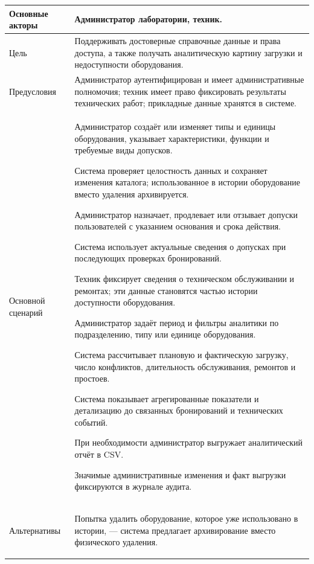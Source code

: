\documentclass[12pt,a4paper]{article}
\renewcommand{\arraystretch}{1.25}
\begin{document}
\begingroup
\small
{}
\renewcommand{\arraystretch}{1.1}
\begin{longtable}{|p{}|p{}|}
\hline
Основные акторы & Администратор лаборатории, техник. \\
\hline
Цель & Поддерживать достоверные справочные данные и права доступа, а также
получать аналитическую картину загрузки и недоступности оборудования. \\
\hline
Предусловия & Администратор аутентифицирован и имеет административные полномочия;
техник имеет право фиксировать результаты технических работ; прикладные данные
хранятся в системе. \\
\hline
Основной сценарий &
\begin{ucsteps}
    \item Администратор создаёт или изменяет типы и единицы оборудования, указывает характеристики, функции и требуемые виды допусков.
    \item Система проверяет целостность данных и сохраняет изменения каталога; использованное в истории оборудование вместо удаления архивируется.
    \item Администратор назначает, продлевает или отзывает допуски пользователей с указанием основания и срока действия.
    \item Система использует актуальные сведения о допусках при последующих проверках бронирований.
    \item Техник фиксирует сведения о техническом обслуживании и ремонтах; эти данные становятся частью истории доступности оборудования.
    \item Администратор задаёт период и фильтры аналитики по подразделению, типу или единице оборудования.
    \item Система рассчитывает плановую и фактическую загрузку, число конфликтов, длительность обслуживания, ремонтов и простоев.
    \item Система показывает агрегированные показатели и детализацию до связанных бронирований и технических событий.
    \item При необходимости администратор выгружает аналитический отчёт в CSV.
    \item Значимые административные изменения и факт выгрузки фиксируются в журнале аудита.
\end{ucsteps} \\
\hline
Альтернативы &
\begin{ucalts}
    \item Попытка удалить оборудование, которое уже использовано в истории, --- система предлагает архивирование вместо физического удаления.

\end{ucalts}
\end{longtable}
\end{document}
